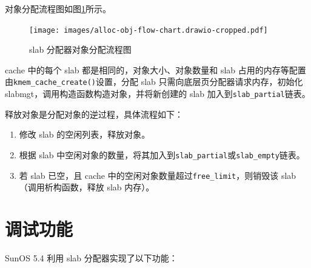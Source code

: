 \documentclass[AutoFakeBold]{LZUThesis}
\begin{document}
\begin{sloppypar}
对象分配流程图如图\ref{figure:slab-allocator-obj-alloc-flow-chart}所示。

\begin{figure}[H]
\centering
\texttt{[image: images/alloc-obj-flow-chart.drawio-cropped.pdf]}
\caption{slab 分配器对象分配流程图}
\label{figure:slab-allocator-obj-alloc-flow-chart}
\end{figure}

cache 中的每个 slab 都是相同的，对象大小、对象数量和 slab
占用的内存等配置由\texttt{kmem\_cache\_create()}设置，分配 slab 只需向底层页分配器请求内存，初始化 slabmgt，调用构造函数构造对象，并将新创建的 slab 加入到\texttt{slab\_partial}链表。

释放对象是分配对象的逆过程，具体流程如下：

\begin{enumerate}
\def\labelenumi{\arabic{enumi}.}
\item
  修改 slab 的空闲列表，释放对象。
\item
  根据 slab
  中空闲对象的数量，将其加入到\texttt{slab\_partial}或\texttt{slab\_empty}链表。
\item
  若 slab 已空，且 cache
  中的空闲对象数量超过\texttt{free\_limit}，则销毁该
  slab（调用析构函数，释放 slab 内存）。
\end{enumerate}


\section{调试功能}

SunOS 5.4 利用 slab 分配器实现了以下功能：


\end{sloppypar}
\end{document}
